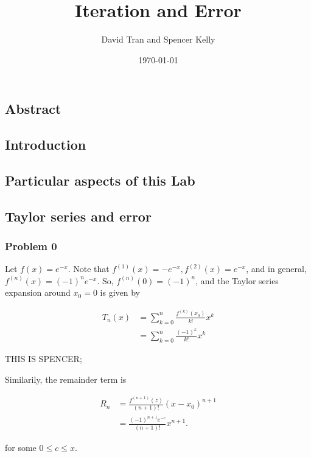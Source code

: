 \documentclass[letter,11pt]{article}
\title{Iteration and Error}
\author{David Tran and Spencer Kelly}
\date{\today}
\begin{document}
\maketitle

\subsection*{Abstract}

\subsection*{Introduction}

\subsection*{Particular aspects of this Lab }

\subsection*{Taylor series and error}
\subsubsection*{Problem 0}
Let $f(x) = e^{-x}$. Note that $f^{(1)}(x) = -e^{-x}, f^{(2)}(x) = e^{-x}$, and in general, $f^{(n)}(x) = (-1)^ne^{-x}$. So, $f^{(n)}(0) = (-1)^n$, and the Taylor series expansion around $x_0 = 0$ is given by

\begin{align*}
T_n(x) &= \sum_{k = 0}^n \frac{f^{(k)}(x_0)}{k!} x^k \\
&= \sum_{k = 0}^n \frac{(-1)^k}{k!}x^k
\end{align*}

THIS IS SPENCER;

Similarily, the remainder term is

\begin{align*}
R_n &= \frac{f^{(n + 1)}(z)}{(n + 1)!}(x - x_0)^{n + 1} \\
&= \frac{(-1)^{n + 1} e^{-c}}{(n + 1)!}x^{n + 1}.
\end{align*}

for some $0 \leq c \leq x$.
\end{document}
